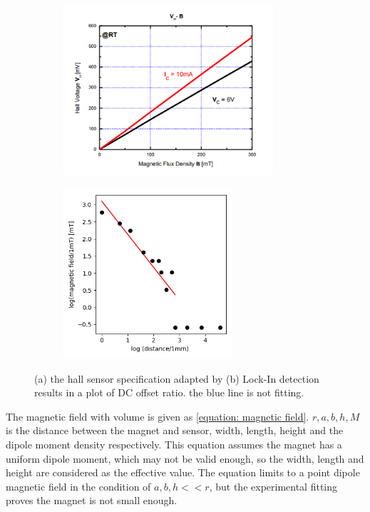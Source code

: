\documentclass{article}
\begin{document}
\begin{figure}[H]
  \begin{subfigure}[b]{7.8cm}
    \centering
    \includegraphics[width=7.8cm]{../results/hall_sensor_character.png}
    \caption{}
\end{subfigure}
  \begin{subfigure}[b]{6.3cm}
    \centering
    \includegraphics[width=6.3cm]{../results/hall_effect_results_log_plot.png}
    \caption{}
\end{subfigure}

  \caption{(a) the hall sensor specification adapted by \cite{hall_sensor} (b) Lock-In detection results in a plot of DC offset ratio. the blue line is not fitting. }
  \label{fig: hall_effect_log_results}
\end{figure}

The magnetic field with volume is given as \ref{equation: magnetic field}.
$r, a,b,h, M$ is the distance between the magnet and sensor, width, length, height and the dipole moment density respectively.
This equation assumes the magnet has a uniform dipole moment, which may not be valid enough, so the width, length and height are considered as the effective value.
The equation limits to a point dipole magnetic field in the condition of $a,b,h << r$, but the experimental fitting proves the magnet is not small enough.
\end{document}
